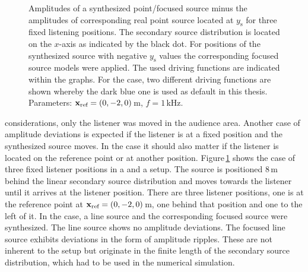 %
\begin{figure}
    \centering
    \small
    
    \caption{Amplitudes of a synthesized point/focused source minus the
    amplitudes of corresponding real point source located at $y_\text{s}$
    for three fixed listening positions.
    The secondary source distribution is located on the $x$-axis as
    indicated by the black dot. For positions of the synthesized source with
    negative $y_\text{s}$ values the corresponding focused source models were
    applied. The used driving functions are indicated within the graphs. For the
    \twohalfD case, two different driving functions are shown whereby the dark
    blue one is used as default in this thesis.
    Parameters: $\mathbf{x}_\text{ref} = (0,-2,0)$\,m,
    $f=1$\,kHz.
    }
    \label{fig:amplitudes_moving_source}
\end{figure}
%
 considerations,
only the listener was moved in the audience area. Another case of
amplitude deviations is expected if the listener is at a fixed position and the
synthesized source moves. In the \twohalfD case it should also matter if the listener is
located on the reference point or at another position.
Figure\,\ref{fig:amplitudes_moving_source} shows the case of three fixed
listener positions in a \twoD and a \twohalfD setup. The source is positioned
$8$\,m behind the linear secondary source distribution and moves
towards the listener until it arrives at the listener position.
There are three listener positions, one is at the reference point at $\mathbf{x}_\text{ref} = (0,-2,0)$\,m,
one behind that position and one to the left of it. In the \twoD case, a line source
and the corresponding focused source were synthesized. The line source shows no
amplitude deviations. The focused line source
exhibits deviations in  the form of amplitude ripples. These are not inherent to
the \twoD setup but originate in the finite length of the secondary source
distribution,
which had to be used in the numerical simulation.

